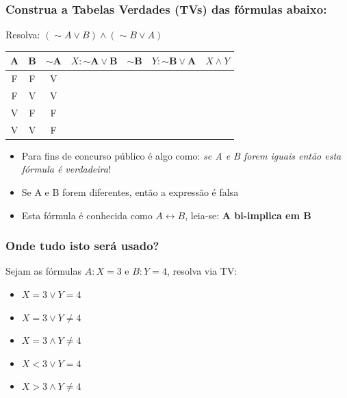 \documentclass{beamer}
\begin{document}
\begin{frame}
\frametitle{Construa a Tabelas Verdades (TVs) das fórmulas abaixo:}


\begin{block}{Resolva: $(\sim A \vee B) \wedge (\sim B \vee A) $}
\begin{center}

	\begin{tabular}{|c|c|c|c|c|c|c|}
	\hline 	\hline
	$\mathbf{A}$ & $\mathbf{B}$ & $\mathbf{\sim A}$ & $X:\mathbf{\sim A \vee B}$ & $\mathbf{\sim B}$ & $Y:\mathbf{\sim B \vee A}$ & $X \wedge Y $ \\
	\hline
	F & F & V &  &  &  &   \\	
	\hline
	F & V & V &  &  &  &   \\
	\hline
	V & F & F &  &  &  &   \\
	\hline
	V & V & F &  &  &  &   \\
	\hline 	\hline
	\end{tabular}
\end{center}
  
\begin{itemize}
   \item Para fins de concurso público é algo como: \textit{se A e B forem iguais então esta fórmula é verdadeira}!
  \item Se A e B forem diferentes, então a expressão é falsa
    \item  Esta fórmula é conhecida como $A \leftrightarrow  B$, leia-se: \textbf{A bi-implica em B}

  \end{itemize}
  \end{block}


\end{frame}




\begin{frame}
\frametitle{Onde tudo isto será usado?}


\begin{block}{Sejam as fórmulas  $A:X=3$ e $B:Y=4$, resolva via TV: }

\begin{itemize}

    \item $X = 3 \vee   Y = 4$
    \item $X = 3 \vee   Y \neq 4$
    \item $X = 3 \wedge Y \neq 4$
    \item $X < 3 \vee   Y = 4$
    \item $X > 3 \wedge Y \neq 4$

\end{itemize}

  \end{block}


\end{frame}
\end{document}
